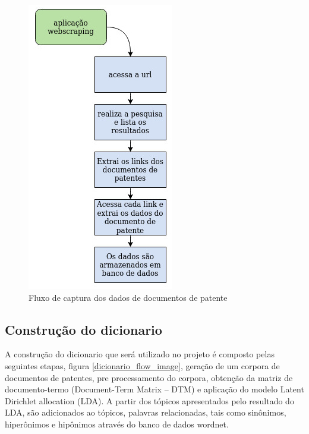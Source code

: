 \begin{figure}[ht!]
	\centering
	\includegraphics[scale=0.5]{imagens/tcc_webscraping.jpg}
	\caption{Fluxo de captura dos dados de documentos de patente 
			 \label{webscraping_flow_image}}
\end{figure}


\subsection{Construção do dicionario}
A construção do dicionario que será utilizado no projeto é composto pelas seguintes etapas, figura \ref{dicionario_flow_image}, geração de um corpora de documentos de patentes, pre processamento do corpora, obtenção da matriz de documento-termo (Document-Term Matrix – DTM) e aplicação do modelo Latent Dirichlet allocation (LDA). A partir dos tópicos apresentados pelo resultado do LDA, são adicionados ao tópicos, palavras relacionadas, tais como sinônimos, hiperônimos e hipônimos através do banco de dados wordnet.


